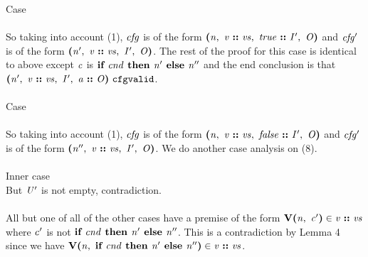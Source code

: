 \documentclass[12pt]{article}
\begin{document}
Case
\\
\\

So taking into account (1), $\mathit{cfg}$ is of the form
$\textbf{(}\mathit{n},\ \mathit{v}\ \textbf{::}\ \mathit{vs},\ \mathit{true}\ \textbf{::}\ \mathit{I'},\ \mathit{O}\textbf{)}$
and $\mathit{cfg'}$ is of the form
$\textbf{(}\mathit{n'},\ \mathit{v}\ \textbf{::}\ \mathit{vs},\ \mathit{I'},\ \mathit{O}\textbf{)}$.
The rest of the proof for this case is identical to above except $\mathit{c}$ is
$\textbf{if }\mathit{cnd}\textbf{ then }\mathit{n'}\textbf{ else }\mathit{n''}$ and the end conclusion is that
$\textbf{(}\mathit{n'},\ \mathit{v}\ \textbf{::}\ \mathit{vs},\ \mathit{I'},\ \mathit{a}\ \textbf{::}\ \mathit{O}\textbf{)}\ \mathtt{cfgvalid}$.\\
\\

Case
\\
\\

So taking into account (1), $\mathit{cfg}$ is of the form
$\textbf{(}\mathit{n},\ \mathit{v}\ \textbf{::}\ \mathit{vs},\ \mathit{false}\ \textbf{::}\ \mathit{I'},\ \mathit{O}\textbf{)}$
and $\mathit{cfg'}$ is of the form
$\textbf{(}\mathit{n''},\ \mathit{v}\ \textbf{::}\ \mathit{vs},\ \mathit{I'},\ \mathit{O}\textbf{)}$. We do
another case analysis on (8).\\
\\

Inner case
\\

But $\mathit{U'}$ is not empty, contradiction.\\
\\

All but one of all of the other cases have a premise of the form
$\textbf{V(}\mathit{n},\ \mathit{c'}\textbf{)} \in \mathit{v}\ \textbf{::}\ \mathit{vs}$ where
$\mathit{c'}$ is not $\textbf{if }\mathit{cnd}\textbf{ then }\mathit{n'}\textbf{ else }\mathit{n''}$. This is a
contradiction by Lemma 4 since we have
$\textbf{V(}\mathit{n},\ \textbf{if }\mathit{cnd}\textbf{ then }\mathit{n'}\textbf{ else }\mathit{n''}\textbf{)} \in
\mathit{v}\ \textbf{::}\ \mathit{vs}$.\\
\\
\end{document}
